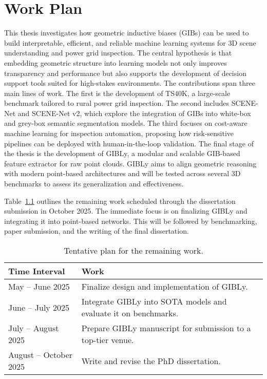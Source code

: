 
%

\chapter{Work Plan}\label{cha:work_plan}

This thesis investigates how geometric inductive biases (GIBs) can be used to
build interpretable, efficient, and reliable machine learning systems for 3D
scene understanding and power grid inspection. The central hypothesis is that
embedding geometric structure into learning models not only improves
transparency and performance but also supports the development of decision
support tools suited for high-stakes environments.
%
The contributions span three main lines of work. The first is the development
of TS40K, a large-scale benchmark tailored to rural power grid inspection. The
second includes SCENE-Net and SCENE-Net v2, which explore the integration of
GIBs into white-box and grey-box semantic segmentation models. The third
focuses on cost-aware machine learning for inspection automation, proposing how
risk-sensitive pipelines can be deployed with human-in-the-loop validation.
%
The final stage of the thesis is the development of GIBLy, a modular and
scalable GIB-based feature extractor for raw point clouds. GIBLy aims to align
geometric reasoning with modern point-based architectures and will be tested
across several 3D benchmarks to assess its generalization and effectiveness.

Table~\ref{tab:workplan} outlines the remaining work scheduled through the
dissertation submission in October 2025. The immediate focus is on finalizing
GIBLy and integrating it into point-based networks. This will be
followed by benchmarking, paper submission, and the writing of the final
dissertation.

\begin{table}[h]
    \centering
    \begin{tabular}{lp{}}
        \hline
        \textbf{Time Interval} & \textbf{Work}                                                                          \\ \hline
        May -- June 2025        & Finalize design and implementation of GIBLy.            \\ \hline
        June -- July 2025       & Integrate GIBLy into SOTA models and evaluate it on benchmarks. \\ \hline
        July -- August 2025     & Prepare GIBLy manuscript for submission to a top-tier venue.   \\ \hline
        August -- October 2025  & Write and revise the PhD dissertation. \\ \hline
    \end{tabular}
    \caption{Tentative plan for the remaining work.}
    \label{tab:workplan}
\end{table}